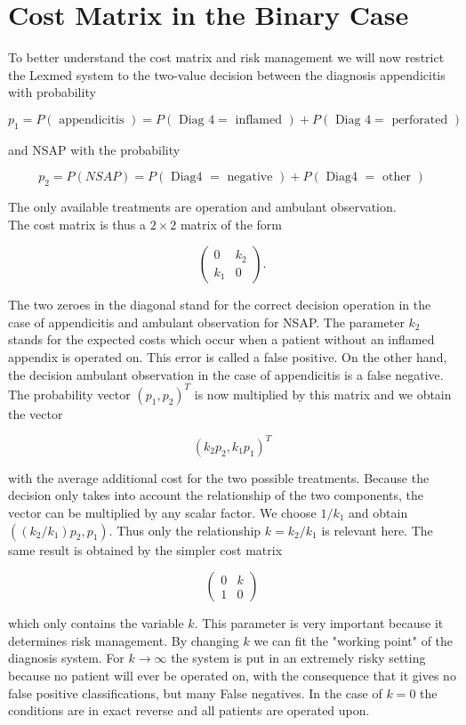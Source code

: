 \documentclass[10pt]{book}
\begin{document}
\section*{Cost Matrix in the Binary Case}
To better understand the cost matrix and risk management we will now restrict the Lexmed system to the two-value decision between the diagnosis appendicitis with probability

$$
p_{1}=P(\text { appendicitis })=P(\text { Diag } 4=\text { inflamed })+P(\text { Diag } 4=\text { perforated })
$$

and NSAP with the probability

$$
p_{2}=P(N S A P)=P(\text { Diag4 }=\text { negative })+P(\text { Diag4 }=\text { other })
$$

The only available treatments are operation and ambulant observation.\\
The cost matrix is thus a $2 \times 2$ matrix of the form

$$
\left(\begin{array}{cc}
0 & k_{2} \\
k_{1} & 0
\end{array}\right) .
$$

The two zeroes in the diagonal stand for the correct decision operation in the case of appendicitis and ambulant observation for NSAP. The parameter $k_{2}$ stands for the expected costs which occur when a patient without an inflamed appendix is operated on. This error is called a false positive. On the other hand, the decision ambulant observation in the case of appendicitis is a false negative. The probability vector $\left(p_{1}, p_{2}\right)^{T}$ is now multiplied by this matrix and we obtain the vector

$$
\left(k_{2} p_{2}, k_{1} p_{1}\right)^{T}
$$

with the average additional cost for the two possible treatments. Because the decision only takes into account the relationship of the two components, the vector can be multiplied by any scalar factor. We choose $1 / k_{1}$ and obtain $\left(\left(k_{2} / k_{1}\right) p_{2}, p_{1}\right)$. Thus only the relationship $k=k_{2} / k_{1}$ is relevant here. The same result is obtained by the simpler cost matrix

$$
\left(\begin{array}{ll}
0 & k \\
1 & 0
\end{array}\right)
$$

which only contains the variable $k$. This parameter is very important because it determines risk management. By changing $k$ we can fit the "working point" of the diagnosis system. For $k \rightarrow \infty$ the system is put in an extremely risky setting because no patient will ever be operated on, with the consequence that it gives no false positive classifications, but many False negatives. In the case of $k=0$ the conditions are in exact reverse and all patients are operated upon.
\end{document}
